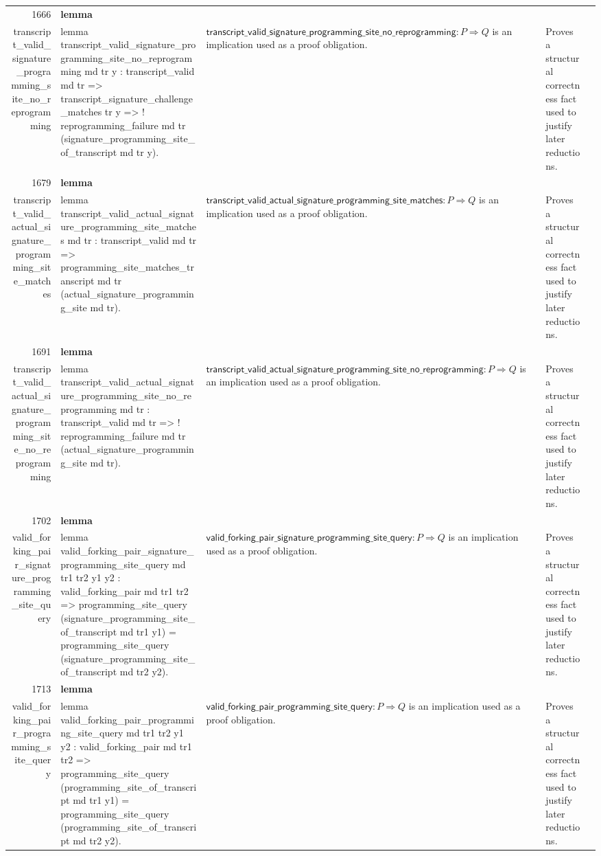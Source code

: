 \documentclass[10pt]{article}
\newcommand{\ec}[1]{\begingroup\ttfamily\scriptsize #1\endgroup}
\begin{document}
\begin{longtable}{r L{0.17\textwidth} L{0.26\textwidth} L{0.27\textwidth} L{0.20\textwidth}}
1666 & \textbf{lemma}\\\ec{transcript\_valid\_signature\_programming\_site\_no\_reprogramming} & \ec{lemma transcript\_valid\_signature\_programming\_site\_no\_reprogramming md tr y : transcript\_valid md tr => transcript\_signature\_challenge\_matches tr y => ! reprogramming\_failure md tr (signature\_programming\_site\_of\_transcript md tr y).} & \(\mathsf{transcript\_valid\_signature\_programming\_site\_no\_reprogramming} : P \Rightarrow Q\) is an implication used as a proof obligation. & Proves a structural correctness fact used to justify later reductions. \\
1679 & \textbf{lemma}\\\ec{transcript\_valid\_actual\_signature\_programming\_site\_matches} & \ec{lemma transcript\_valid\_actual\_signature\_programming\_site\_matches md tr : transcript\_valid md tr => programming\_site\_matches\_transcript md tr (actual\_signature\_programming\_site md tr).} & \(\mathsf{transcript\_valid\_actual\_signature\_programming\_site\_matches} : P \Rightarrow Q\) is an implication used as a proof obligation. & Proves a structural correctness fact used to justify later reductions. \\
1691 & \textbf{lemma}\\\ec{transcript\_valid\_actual\_signature\_programming\_site\_no\_reprogramming} & \ec{lemma transcript\_valid\_actual\_signature\_programming\_site\_no\_reprogramming md tr : transcript\_valid md tr => ! reprogramming\_failure md tr (actual\_signature\_programming\_site md tr).} & \(\mathsf{transcript\_valid\_actual\_signature\_programming\_site\_no\_reprogramming} : P \Rightarrow Q\) is an implication used as a proof obligation. & Proves a structural correctness fact used to justify later reductions. \\
1702 & \textbf{lemma}\\\ec{valid\_forking\_pair\_signature\_programming\_site\_query} & \ec{lemma valid\_forking\_pair\_signature\_programming\_site\_query md tr1 tr2 y1 y2 : valid\_forking\_pair md tr1 tr2 => programming\_site\_query (signature\_programming\_site\_of\_transcript md tr1 y1) = programming\_site\_query (signature\_programming\_site\_of\_transcript md tr2 y2).} & \(\mathsf{valid\_forking\_pair\_signature\_programming\_site\_query} : P \Rightarrow Q\) is an implication used as a proof obligation. & Proves a structural correctness fact used to justify later reductions. \\
1713 & \textbf{lemma}\\\ec{valid\_forking\_pair\_programming\_site\_query} & \ec{lemma valid\_forking\_pair\_programming\_site\_query md tr1 tr2 y1 y2 : valid\_forking\_pair md tr1 tr2 => programming\_site\_query (programming\_site\_of\_transcript md tr1 y1) = programming\_site\_query (programming\_site\_of\_transcript md tr2 y2).} & \(\mathsf{valid\_forking\_pair\_programming\_site\_query} : P \Rightarrow Q\) is an implication used as a proof obligation. & Proves a structural correctness fact used to justify later reductions. \\

\end{longtable}
\end{document}
